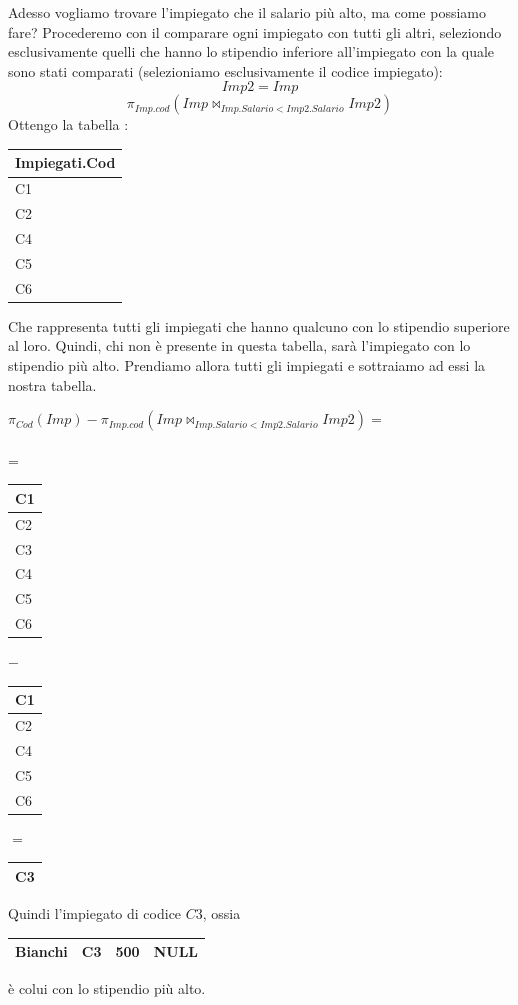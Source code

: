 \documentclass[12pt, letterpaper]{article}
\begin{document}
Adesso vogliamo trovare l'impiegato che il salario più alto, ma come possiamo fare? Procederemo con il comparare 
ogni impiegato con tutti gli altri, seleziondo esclusivamente quelli che hanno lo stipendio inferiore all'impiegato 
con la quale sono stati comparati (selezioniamo esclusivamente il codice impiegato):\begin{equation}
    Imp2=Imp
\end{equation}
\begin{equation}
    \pi_{Imp.cod}(Imp \Join_{Imp.Salario<Imp2.Salario}Imp2)
\end{equation}
\newpage Ottengo la tabella :
\begin{center}
    \begin{tabular}{|l|}
        \hline
        Impiegati.Cod \\ \hline
        C1            \\ \hline
        C2            \\ \hline
        C4            \\ \hline
        C5            \\ \hline
        C6            \\ \hline
        \end{tabular}
\end{center}
Che rappresenta tutti gli impiegati che hanno qualcuno con lo stipendio superiore al loro. Quindi,
chi non è presente in questa tabella, sarà l'impiegato con lo stipendio più alto. Prendiamo allora tutti 
gli impiegati e sottraiamo ad essi la nostra tabella.
\begin{center}
    \(\pi_{Cod}(Imp)-\pi_{Imp.cod}(Imp \Join_{Imp.Salario<Imp2.Salario}Imp2)=\)\\\hphantom{.}\\=
    \begin{tabular}{|l|}
        \hline
        C1 \\ \hline
        C2 \\ \hline
        C3 \\ \hline
        C4 \\ \hline
        C5 \\ \hline
        C6 \\ \hline
        \end{tabular} \(-\)
        \begin{tabular}{|l|}
            \hline
            C1 \\ \hline
            C2 \\ \hline
            C4 \\ \hline
            C5 \\ \hline
            C6 \\ \hline
            \end{tabular}
            \(=\)
    \begin{tabular}{|l|}
        \hline
        C3 \\ \hline
        \end{tabular}
\end{center}
Quindi l'impiegato di codice \(C3\), ossia \begin{tabular}{|l|l|l|l|}
    \hline
    Bianchi & C3 & 500 & NULL \\ \hline
    \end{tabular} è colui con lo stipendio più alto. 
\end{document}
